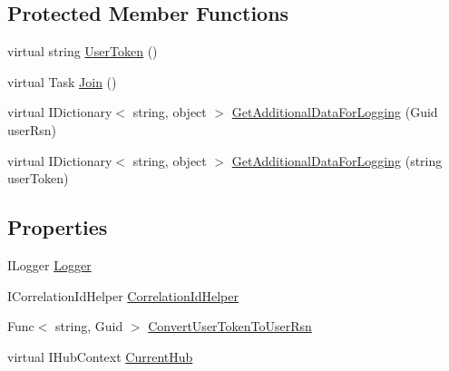\subsection*{Protected Member Functions}
\begin{DoxyCompactItemize}
\item 
virtual string \hyperlink{classCqrs_1_1WebApi_1_1SignalR_1_1Hubs_1_1NotificationHub_a649436109e0060be9224aff8e75986b4}{User\+Token} ()
\item 
virtual Task \hyperlink{classCqrs_1_1WebApi_1_1SignalR_1_1Hubs_1_1NotificationHub_ae5915026e53a6d7b9929f703688ce90c}{Join} ()
\item 
virtual I\+Dictionary$<$ string, object $>$ \hyperlink{classCqrs_1_1WebApi_1_1SignalR_1_1Hubs_1_1NotificationHub_a4b662758eb3732be37b9702c8d4e1791}{Get\+Additional\+Data\+For\+Logging} (Guid user\+Rsn)
\item 
virtual I\+Dictionary$<$ string, object $>$ \hyperlink{classCqrs_1_1WebApi_1_1SignalR_1_1Hubs_1_1NotificationHub_a4c2512231d4ad5975fa584b14c2974c3}{Get\+Additional\+Data\+For\+Logging} (string user\+Token)
\end{DoxyCompactItemize}
\subsection*{Properties}
\begin{DoxyCompactItemize}
\item 
I\+Logger \hyperlink{classCqrs_1_1WebApi_1_1SignalR_1_1Hubs_1_1NotificationHub_a94a46d2beddc12c3920b33b53e579d36}{Logger}
\item 
I\+Correlation\+Id\+Helper \hyperlink{classCqrs_1_1WebApi_1_1SignalR_1_1Hubs_1_1NotificationHub_aa65bf9c3c24588f4c36522fe7f911949}{Correlation\+Id\+Helper}
\item 
Func$<$ string, Guid $>$ \hyperlink{classCqrs_1_1WebApi_1_1SignalR_1_1Hubs_1_1NotificationHub_a255a9ddc4f274cab0eae62e827f3726a}{Convert\+User\+Token\+To\+User\+Rsn}
\item 
virtual I\+Hub\+Context \hyperlink{classCqrs_1_1WebApi_1_1SignalR_1_1Hubs_1_1NotificationHub_a27c6b1d7673af05bab0305e00aef9be7}{Current\+Hub}
\end{DoxyCompactItemize}


